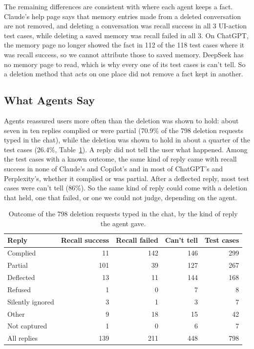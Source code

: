     The remaining differences are consistent with where each agent keeps a fact. Claude's help page says that memory entries made from a deleted conversation are not removed, and deleting a conversation was recall success in all 3 UI-action test cases, while deleting a saved memory was recall failed in all 3. On ChatGPT, the memory page no longer showed the fact in 112 of the 118 test cases where it was recall success, so we cannot attribute those to saved memory. DeepSeek has no memory page to read, which is why every one of its test cases is can't tell. So a deletion method that acts on one place did not remove a fact kept in another.

    \subsection{What Agents Say}

    Agents reassured users more often than the deletion was shown to hold: about seven in ten replies complied or were partial (70.9\% of the 798 deletion requests typed in the chat), while the deletion was shown to hold in about a quarter of the test cases (26.4\%, Table~\ref{tab:replies-outcome}). A reply did not tell the user what happened. Among the test cases with a known outcome, the same kind of reply came with recall success in none of Claude's and Copilot's and in most of ChatGPT's and Perplexity's, whether it complied or was partial. After a deflected reply, most test cases were can't tell (86\%). So the same kind of reply could come with a deletion that held, one that failed, or one we could not judge, depending on the agent.

    \begin{table}[!t]
    \centering
    \caption{Outcome of the 798 deletion requests typed in the chat, by the kind of reply the agent gave.}
    \label{tab:replies-outcome}
    \footnotesize
    \begin{tabular}{@{}lrrrr@{}}
    \toprule
    Reply & Recall success & Recall failed & Can't tell & Test cases \\
    \midrule
    Complied & 11 & 142 & 146 & 299 \\
Partial & 101 & 39 & 127 & 267 \\
Deflected & 13 & 11 & 144 & 168 \\
Refused & 1 & 0 & 7 & 8 \\
Silently ignored & 3 & 1 & 3 & 7 \\
Other & 9 & 18 & 15 & 42 \\
Not captured & 1 & 0 & 6 & 7 \\
    \midrule
    All replies & 139 & 211 & 448 & 798 \\
    \bottomrule
    \end{tabular}
    \end{table}

